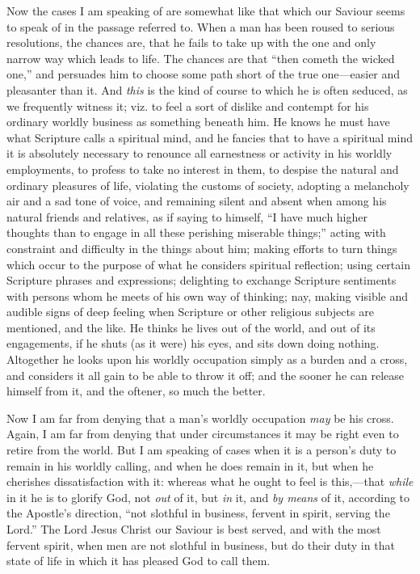 Now the cases I am speaking of are somewhat like that which our
Saviour seems to speak of in the passage referred to. When a man has
been roused to serious resolutions, the chances are, that he fails to
take up with the one and only narrow way which leads to life. The
chances are that ``then cometh the wicked one,'' and persuades
him to choose some path short of the true one—easier and pleasanter
than it. And \emph{this} is the kind of course to which he is often
seduced, as we frequently witness it; viz. to feel a sort of dislike
and contempt for his ordinary worldly business as something beneath
him. He knows he must have what Scripture calls a spiritual mind, and
he fancies that to have a spiritual mind it is absolutely necessary to
renounce all earnestness or activity in his worldly employments, to
profess to take no interest in them, to despise the natural and
ordinary pleasures of life, violating the customs of society, adopting
a melancholy air and a sad tone of voice, and remaining silent and
absent when among his natural friends and relatives, as if saying to
himself, ``I have much higher thoughts than to engage in all these
perishing miserable things;'' acting with constraint and
difficulty in the things about him; making efforts to turn things
which occur to the purpose of what he considers spiritual reflection;
using certain Scripture phrases and expressions; delighting to
exchange Scripture sentiments with persons whom he meets of his own
way of thinking; nay, making visible and audible signs of deep feeling
when Scripture or other religious subjects are mentioned, and the
like. He thinks he lives out of the world, and out of its engagements,
if he shuts (as it were) his eyes, and sits down doing nothing.
Altogether he looks upon his worldly occupation simply as a burden and
a cross, and considers it all gain to be able to throw it off; and the
sooner he can release himself from it, and the oftener, so much the
better.

Now I am far from denying that a man's worldly occupation \emph{may}
be his cross. Again, I am far from denying that under circumstances it
may be right even to retire from the world. But I am speaking of cases
when it is a person's duty to remain in his worldly calling, and when
he does remain in it, but when he cherishes dissatisfaction with it:
whereas what he ought to feel is this,—that \emph{while} in it he is
to glorify God, not \emph{out} of it, but \emph{in} it, and \emph{by
means} of it, according to the Apostle's direction, ``not
slothful in business, fervent in spirit, serving the Lord.'' The
Lord Jesus Christ our Saviour is best served, and with the most
fervent spirit, when men are not slothful in business, but do their
duty in that state of life in which it has pleased God to call them.


